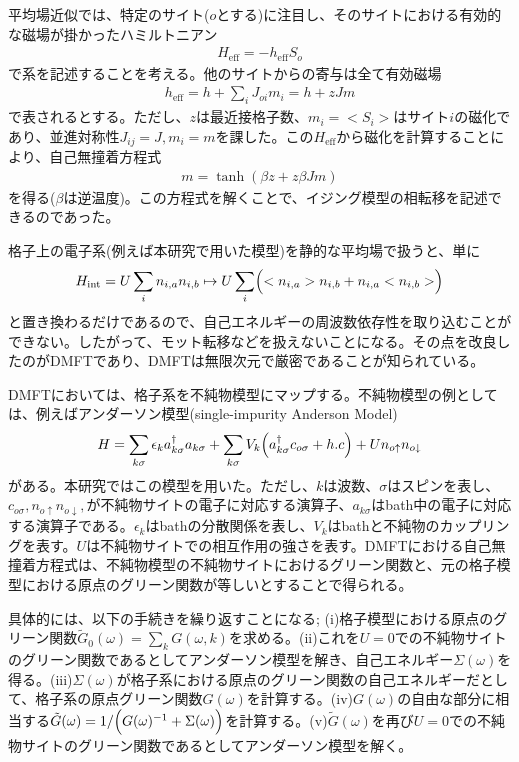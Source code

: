 \documentclass[12pt]{jsbook}
\begin{document}
平均場近似では、特定のサイト($o$とする)に注目し、そのサイトにおける有効的な磁場が掛かったハミルトニアン
\begin{eqnarray}
H_{\mathrm{eff}} = -h_{\mathrm{eff}}S_o
\end{eqnarray}
で系を記述することを考える。他のサイトからの寄与は全て有効磁場
\begin{eqnarray}
    h_{\mathrm{eff}}=h + \sum_{i}J_{oi}m_i=h+zJm
\end{eqnarray}
で表されるとする。ただし、$z$は最近接格子数、$m_i = <S_i>$はサイト$i$の磁化であり、並進対称性$J_{ij} = J,m_i = m$を課した。この$H_\mathrm{eff}$から磁化を計算することにより、自己無撞着方程式
\begin{eqnarray}
    m=\tanh(\beta z + z\beta Jm)
\end{eqnarray}
を得る($\beta$は逆温度)。この方程式を解くことで、イジング模型の相転移を記述できるのであった。

格子上の電子系(例えば本研究で用いた模型)を静的な平均場で扱うと、単に
\begin{eqnarray}
    H_\mathrm{int} = U\displaystyle \sum_i n_{i,a}n_{i,b}\mapsto U\sum_i\Bigl( <n_{i,a}>n_{i,b}+n_{i,a}<n_{i,b}>\Bigr)
\end{eqnarray}
と置き換わるだけであるので、自己エネルギーの周波数依存性を取り込むことができない。したがって、モット転移などを扱えないことになる。その点を改良したのがDMFTであり、DMFTは無限次元で厳密であることが知られている。

DMFTにおいては、格子系を不純物模型にマップする。不純物模型の例としては、例えばアンダーソン模型(single-impurity Anderson Model)
\begin{eqnarray}
    H=\sum_{k\sigma}\epsilon_k a^{\dagger}_{k\sigma}a_{k\sigma} + \sum_{k\sigma}V_k\Bigl(a^{\dagger}_{k\sigma}c_{o\sigma}+h.c\Bigr) + Un_{o\uparrow}n_{o\downarrow}
\end{eqnarray}
がある。本研究ではこの模型を用いた。ただし、$k$は波数、$\sigma$はスピンを表し、$c_{o\sigma},n_{o\uparrow}n_{o\downarrow},$が不純物サイトの電子に対応する演算子、$a_{k\sigma}$はbath中の電子に対応する演算子である。$\epsilon_k$はbathの分散関係を表し、$V_k$はbathと不純物のカップリングを表す。$U$は不純物サイトでの相互作用の強さを表す。DMFTにおける自己無撞着方程式は、不純物模型の不純物サイトにおけるグリーン関数と、元の格子模型における原点のグリーン関数が等しいとすることで得られる。

具体的には、以下の手続きを繰り返すことになる;
(i)格子模型における原点のグリーン関数$\tilde{G}_{0}(\omega)=\sum_{k}G(\omega,k)$を求める。(ii)これを$U=0$での不純物サイトのグリーン関数であるとしてアンダーソン模型を解き、自己エネルギー$\Sigma(\omega)$を得る。(iii)$\Sigma(\omega)$が格子系における原点のグリーン関数の自己エネルギーだとして、格子系の原点グリーン関数$G(\omega)$を計算する。(iv)$G(\omega)$の自由な部分に相当する$\tilde{G}(\omega)=1/\Bigl(G(\omega)^{-1}+\Sigma(\omega)\Bigr)$を計算する。(v)$\tilde{G}(\omega)$を再び$U=0$での不純物サイトのグリーン関数であるとしてアンダーソン模型を解く。
\end{document}
